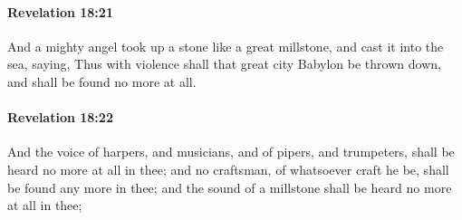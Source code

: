 		\paragraph{Revelation 18:21} %
			\label{REVELATIONNT-18-21}

			And a mighty angel took up a stone like a great millstone, and cast it into the sea, saying, Thus with violence shall that great city Babylon be thrown down, and shall be found no more at all.

			\begin{framed}
			\scriptsize
				\begin{compactdesc}
					\item[SBLG] 
				\end{compactdesc}
			\end{framed}

		\paragraph{Revelation 18:22} %
			\label{REVELATIONNT-18-22}

			And the voice of harpers, and musicians, and of pipers, and trumpeters, shall be heard no more at all in thee; and no craftsman, of whatsoever craft he be, shall be found any more in thee; and the sound of a millstone shall be heard no more at all in thee;

